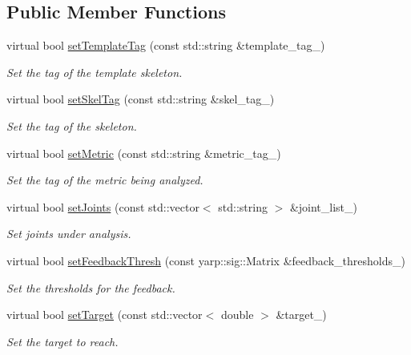 \subsection*{Public Member Functions}
\begin{DoxyCompactItemize}
\item 
virtual bool \hyperlink{classfeedbackProducer__IDL_a9d73388746fdad03567b1930c964c61d}{set\+Template\+Tag} (const std\+::string \&template\+\_\+tag\+\_\+)
\begin{DoxyCompactList}\small\item\em Set the tag of the template skeleton. \end{DoxyCompactList}\item 
virtual bool \hyperlink{classfeedbackProducer__IDL_a415d86e692f8bb4987229f17ca0d90a5}{set\+Skel\+Tag} (const std\+::string \&skel\+\_\+tag\+\_\+)
\begin{DoxyCompactList}\small\item\em Set the tag of the skeleton. \end{DoxyCompactList}\item 
virtual bool \hyperlink{classfeedbackProducer__IDL_a364738f5e3477e52c76d2a22672d840b}{set\+Metric} (const std\+::string \&metric\+\_\+tag\+\_\+)
\begin{DoxyCompactList}\small\item\em Set the tag of the metric being analyzed. \end{DoxyCompactList}\item 
virtual bool \hyperlink{classfeedbackProducer__IDL_a13778ed7bd818fb0093565ff99d936a6}{set\+Joints} (const std\+::vector$<$ std\+::string $>$ \&joint\+\_\+list\+\_\+)
\begin{DoxyCompactList}\small\item\em Set joints under analysis. \end{DoxyCompactList}\item 
virtual bool \hyperlink{classfeedbackProducer__IDL_a509606998529f964664fa22b4457cee2}{set\+Feedback\+Thresh} (const yarp\+::sig\+::\+Matrix \&feedback\+\_\+thresholds\+\_\+)
\begin{DoxyCompactList}\small\item\em Set the thresholds for the feedback. \end{DoxyCompactList}\item 
virtual bool \hyperlink{classfeedbackProducer__IDL_a029ad9dc9918e229624d0dac6f6ca42e}{set\+Target} (const std\+::vector$<$ double $>$ \&target\+\_\+)
\begin{DoxyCompactList}\small\item\em Set the target to reach. \end{DoxyCompactList}\item 

\end{DoxyCompactItemize}
